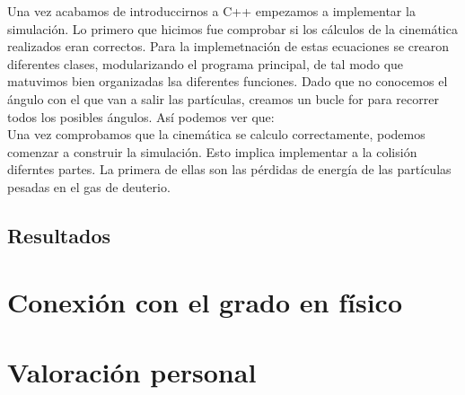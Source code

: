 \documentclass[12pt,a4paper]{article}
\numberwithin{equation}{section}
\numberwithin{figure}{section}
\begin{document}
Una vez acabamos de introduccirnos a C++ empezamos a implementar la simulación. Lo primero que hicimos fue comprobar si los cálculos  de la cinemática realizados eran correctos. Para la implemetnación de estas ecuaciones se crearon diferentes clases, modularizando el programa principal, de tal modo que matuvimos bien organizadas lsa diferentes funciones. Dado que no conocemos el ángulo con el que van a salir las partículas, creamos un bucle for para recorrer todos los posibles ángulos. Así podemos ver que:  \\


Una vez comprobamos que la cinemática se calculo correctamente, podemos comenzar a construir la simulación. Esto implica implementar a la colisión diferntes partes. La primera de ellas son las pérdidas de energía de las partículas pesadas en el gas de deuterio. 


\subsection{Resultados}

\section{Conexión con el grado en físico}

\section{Valoración personal}
\end{document}
